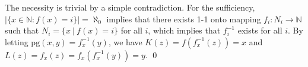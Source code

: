 
\begin{pf} \rm
 The necessity is trivial by a simple contradiction.
 For the sufficiency, $|\{x\in\mathbb{N} : f(x) = i\}|=\aleph_0$ implies that
 there exists 1-1 onto mapping
 $f_i : N_i\to \mathbb{N}$ such that $N_i = \{x~ | ~f(x) = i\}$ for all $i$,
 which implies that $f_i^{-1}$ exists for all $i$.
 By letting $\mathrm{pg}(x, y) = f_x^{-1}(y)$,
 we have $K(z) = f(f_x^{-1}(z)) = x$ and $L(z) 
 = f_x(z) = f_x( f_x^{-1}(y) ) = y$. \qed

\end{pf}
